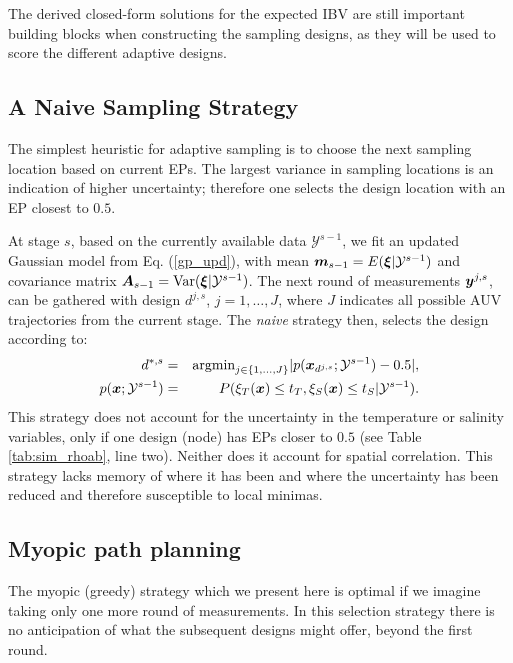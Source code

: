 \documentclass[aoas]{imsart}
\begin{document}
The derived closed-form solutions for the expected IBV are still
important building blocks when constructing the sampling designs, as
they will be used to score the different adaptive designs. %
 
\subsection{A Naive Sampling Strategy}
\label{naive}

The simplest heuristic for adaptive sampling is to choose the next
sampling location based on current EPs. The largest variance in
sampling locations is an indication of higher uncertainty; therefore
one selects the design location with an EP closest to $0.5$.

At stage $s$, based on the currently available data
$\mathcal{Y}^{s-1}$, we fit an updated Gaussian model from
Eq. (\ref{gp_upd}), with mean ${\boldsymbol m}_{s-1}=E({\boldsymbol \xi}|\mathcal{Y}^{s-1})$
and covariance matrix ${\boldsymbol A}_{s-1}=\mbox{Var}({\boldsymbol \xi}|\mathcal{Y}^{s-1})$.
The next round of measurements ${\boldsymbol y}^{j,s}$, can be gathered with
design $d^{j,s}$, $j=1,\ldots,J$, where $J$ indicates all possible AUV
trajectories from the current stage. The {\it{naive}} strategy then,
selects the design according to:
\begin{eqnarray}\label{critNaive}
    d^{*,s} &=& \mbox{argmin}_{j \in \{1,\ldots,J\}} |p(\bx_{d^{j,s}};\mathcal{Y}^{s-1})-0.5|, \\
    p(\bx;\mathcal{Y}^{s-1}) &=& P(\xi_T(\bx) \leq t_T, \xi_S(\bx) \leq t_S | \mathcal{Y}^{s-1}). \nonumber
\end{eqnarray}
This strategy does not account for the uncertainty in the temperature
or salinity variables, only if one design (node) has EPs closer to
$0.5$ (see Table \ref{tab:sim_rhoab}, line two). Neither does it
account for spatial correlation. This strategy lacks memory of where
it has been and where the uncertainty has been reduced and therefore
susceptible to local minimas.

\subsection{Myopic path planning}
\label{myopic}

The myopic (greedy) strategy which we present here is optimal if we
imagine taking only one more round of measurements. In this selection
strategy there is no anticipation of what the subsequent designs might
offer, beyond the first round.
\end{document}

